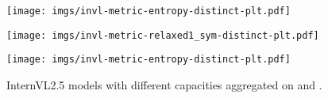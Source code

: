 \begin{figure*}[ht]
    \centering
    \texttt{[image: imgs/invl-metric-entropy-distinct-plt.pdf]}

    \vspace{1em} %

    \texttt{[image: imgs/invl-metric-relaxed1\_sym-distinct-plt.pdf]}

    \vspace{1em} %

    \texttt{[image: imgs/invl-metric-entropy-distinct-plt.pdf]}

    \caption{InternVL2.5 models with different capacities aggregated on \mmscorecoco{} and \mmscorein.}
    \label{fig:mi-model-versions}
\end{figure*}
